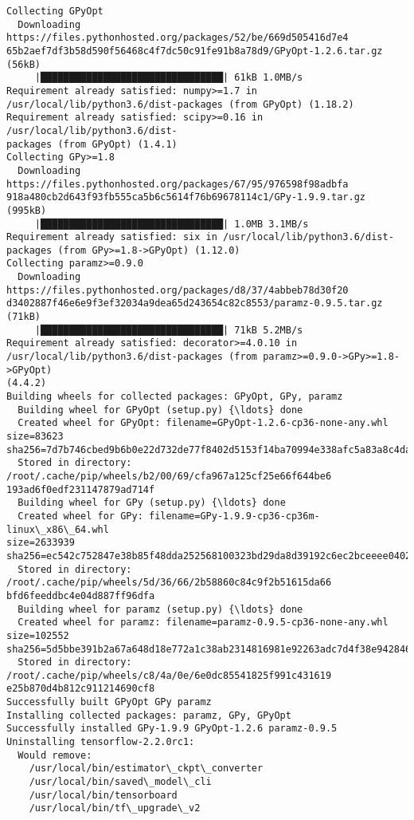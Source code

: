 \documentclass[11pt]{article}
\begin{document}
    \begin{Verbatim}[commandchars=\\\{\}]
Collecting GPyOpt
  Downloading https://files.pythonhosted.org/packages/52/be/669d505416d7e4
65b2aef7df3b58d590f56468c4f7dc50c91fe91b8a78d9/GPyOpt-1.2.6.tar.gz (56kB)
     |████████████████████████████████| 61kB 1.0MB/s
Requirement already satisfied: numpy>=1.7 in
/usr/local/lib/python3.6/dist-packages (from GPyOpt) (1.18.2)
Requirement already satisfied: scipy>=0.16 in /usr/local/lib/python3.6/dist-
packages (from GPyOpt) (1.4.1)
Collecting GPy>=1.8
  Downloading https://files.pythonhosted.org/packages/67/95/976598f98adbfa
918a480cb2d643f93fb555ca5b6c5614f76b69678114c1/GPy-1.9.9.tar.gz (995kB)
     |████████████████████████████████| 1.0MB 3.1MB/s
Requirement already satisfied: six in /usr/local/lib/python3.6/dist-
packages (from GPy>=1.8->GPyOpt) (1.12.0)
Collecting paramz>=0.9.0
  Downloading https://files.pythonhosted.org/packages/d8/37/4abbeb78d30f20
d3402887f46e6e9f3ef32034a9dea65d243654c82c8553/paramz-0.9.5.tar.gz (71kB)
     |████████████████████████████████| 71kB 5.2MB/s
Requirement already satisfied: decorator>=4.0.10 in
/usr/local/lib/python3.6/dist-packages (from paramz>=0.9.0->GPy>=1.8->GPyOpt)
(4.4.2)
Building wheels for collected packages: GPyOpt, GPy, paramz
  Building wheel for GPyOpt (setup.py) {\ldots} done
  Created wheel for GPyOpt: filename=GPyOpt-1.2.6-cp36-none-any.whl size=83623
sha256=7d7b746cbed9b6b0e22d732de77f8402d5153f14ba70994e338afc5a83a8c4da
  Stored in directory: /root/.cache/pip/wheels/b2/00/69/cfa967a125cf25e66f644be6
193ad6f0edf231147879ad714f
  Building wheel for GPy (setup.py) {\ldots} done
  Created wheel for GPy: filename=GPy-1.9.9-cp36-cp36m-linux\_x86\_64.whl
size=2633939
sha256=ec542c752847e38b85f48dda252568100323bd29da8d39192c6ec2bceeee0402
  Stored in directory: /root/.cache/pip/wheels/5d/36/66/2b58860c84c9f2b51615da66
bfd6feeddbc4e04d887ff96dfa
  Building wheel for paramz (setup.py) {\ldots} done
  Created wheel for paramz: filename=paramz-0.9.5-cp36-none-any.whl size=102552
sha256=5d5bbe391b2a67a648d18e772a1c38ab2314816981e92263adc7d4f38e942846
  Stored in directory: /root/.cache/pip/wheels/c8/4a/0e/6e0dc85541825f991c431619
e25b870d4b812c911214690cf8
Successfully built GPyOpt GPy paramz
Installing collected packages: paramz, GPy, GPyOpt
Successfully installed GPy-1.9.9 GPyOpt-1.2.6 paramz-0.9.5
Uninstalling tensorflow-2.2.0rc1:
  Would remove:
    /usr/local/bin/estimator\_ckpt\_converter
    /usr/local/bin/saved\_model\_cli
    /usr/local/bin/tensorboard
    /usr/local/bin/tf\_upgrade\_v2

\end{Verbatim}
\end{document}

